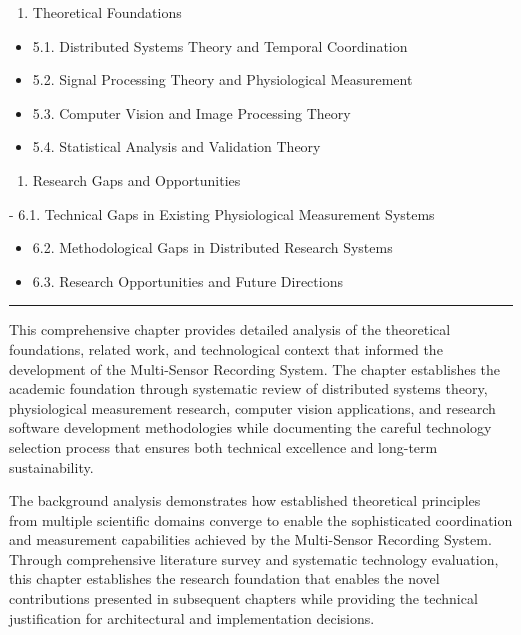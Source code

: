 \documentclass[11pt,a4paper]{report}
\begin{document}
\begin{enumerate}
\item Theoretical Foundations

\end{enumerate}
\begin{itemize}
\item 5.1. Distributed Systems Theory and Temporal Coordination
\item 5.2. Signal Processing Theory and Physiological Measurement
\item 5.3. Computer Vision and Image Processing Theory
\item 5.4. Statistical Analysis and Validation Theory

\end{itemize}
\begin{enumerate}
\item Research Gaps and Opportunities

\end{enumerate}
-
6.1. Technical Gaps in Existing Physiological Measurement Systems
\begin{itemize}
\item 6.2. Methodological Gaps in Distributed Research Systems
\item 6.3. Research Opportunities and Future Directions

\end{itemize}
\hrule

This comprehensive chapter provides detailed analysis of the theoretical foundations, related work, and technological
context that informed the development of the Multi-Sensor Recording System. The chapter establishes the academic
foundation through systematic review of distributed systems theory, physiological measurement research, computer vision
applications, and research software development methodologies while documenting the careful technology selection process
that ensures both technical excellence and long-term sustainability.

The background analysis demonstrates how established theoretical principles from multiple scientific domains converge to
enable the sophisticated coordination and measurement capabilities achieved by the Multi-Sensor Recording System.
Through comprehensive literature survey and systematic technology evaluation, this chapter establishes the research
foundation that enables the novel contributions presented in subsequent chapters while providing the technical
justification for architectural and implementation decisions.
\end{document}
